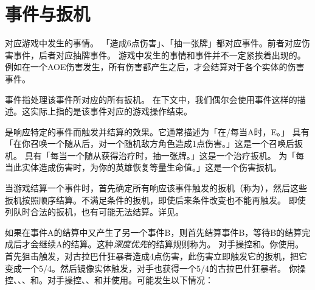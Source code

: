 \section{事件与扳机}
\label{event-and-trigger}

对应游戏中发生的事情。
\example 「造成6点伤害」、「抽一张牌」都对应事件。前者对应伤害事件，后者对应抽牌事件。
\notice 游戏中发生的事情和事件并不一定紧挨着出现的。例如在一个AOE伤害发生，所有伤害都产生之后，才会结算对于各个实体的伤害事件。

事件指处理该事件所对应的所有扳机。
\notice 在下文中，我们偶尔会使用事件这样的描述。这实际上指的是该事件对应的游戏操作结束。

是响应特定的事件而触发并结算的效果。它通常描述为「在/每当A时，E。」
\example {}具有「在你召唤一个随从后，对一个随机敌方角色造成1点伤害。」这是一个召唤后扳机。
\example {}具有「每当一个随从获得治疗时，抽一张牌。」这是一个治疗扳机。
\example {}为「每当此实体造成伤害时，为你的英雄恢复等量生命值。」这是一个伤害扳机。

当游戏结算一个事件时，首先确定所有响应该事件触发的扳机（称为），然后这些扳机按照顺序结算。不满足条件的扳机，即使后来条件改变也不能再触发。
\notice 即使列队时合法的扳机，也有可能无法结算。详见。

如果在事件A的结算中又产生了另一个事件B，则首先结算事件B，等待B的结算完成后才会继续A的结算。这种\emph{深度优先}的结算规则称为。
\example 对手操控和。你使用。首先狙击触发，对古拉巴什狂暴者造成4点伤害，此伤害立即触发它的扳机，把它变成一个5/4。然后镜像实体触发，对手也获得一个5/4的古拉巴什狂暴者。
\example 你操控、、、和。对手操控、、和并使用。可能发生以下情况：


